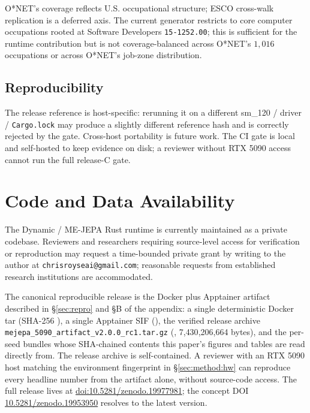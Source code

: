 \documentclass[10pt,twocolumn,letterpaper]{article}
\newcommand{\code}[1]{\texttt{\small #1}}
\newcommand{\sha}[1]{\texttt{\footnotesize\seqsplit{#1}}}
\begin{document}
O*NET's coverage reflects U.S. occupational structure; ESCO
cross-walk replication is a deferred axis. The current generator
restricts to core computer occupations rooted at Software
Developers \code{15-1252.00}; this is sufficient for the runtime
contribution but is not coverage-balanced across O*NET's
$1{,}016$ occupations or across O*NET's job-zone distribution.

\subsection{Reproducibility}

The release reference is host-specific: rerunning it on a
different sm\_120 / driver / \code{Cargo.lock} may produce a
slightly different reference hash and is correctly rejected by
the gate. Cross-host portability is future work. The CI gate is
local and self-hosted to keep evidence on disk; a reviewer
without RTX 5090 access cannot run the full release-C gate.

\section{Code and Data Availability}
\label{sec:code-data}

The Dynamic / ME-JEPA Rust runtime is currently maintained as a
private codebase. Reviewers and researchers requiring source-level
access for verification or reproduction may request a time-bounded
private grant by writing to the author at
\texttt{chrisroyseai@gmail.com}; reasonable requests from
established research institutions are accommodated.

The canonical reproducible release is the Docker plus Apptainer
artifact described in \S\ref{sec:repro} and \S B of the appendix:
a single deterministic Docker tar
(SHA-256 \sha{830304d5\dots e1940b}), a single Apptainer SIF
(\sha{78c87c55\dots f386bad}), the verified release archive
\code{mejepa\_5090\_artifact\_v2.0.0\_rc1.tar.gz}
(\sha{91461515\dots b1a01}, 7{,}430{,}206{,}664 bytes), and the
per-seed bundles whose SHA-chained contents this paper's figures
and tables are read directly from. The release archive is
self-contained. A reviewer with an RTX 5090 host matching the
environment fingerprint in \S\ref{sec:method:hw} can reproduce
every headline number from the artifact alone, without source-code
access. The full release lives at
\href{https://doi.org/10.5281/zenodo.19977981}{doi:10.5281/zenodo.19977981};
the concept DOI \href{https://doi.org/10.5281/zenodo.19953950}{10.5281/zenodo.19953950}
resolves to the latest version.
\end{document}
